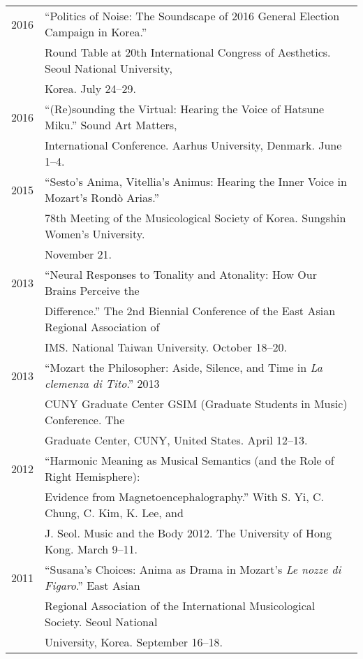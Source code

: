 \documentclass[a4paper,11pt]{article}
\begin{document}
  \hspace*{-0.25cm}
  \begin{tabular}{p{2.5cm} p{12.5cm}}
  2016 & ``Politics of Noise: The Soundscape of 2016 General Election Campaign in Korea.''\\
  & Round Table at 20th International Congress of Aesthetics. Seoul National University,\\
  & Korea. July 24--29.\\[2mm]
  
  2016 & ``(Re)sounding the Virtual: Hearing the Voice of Hatsune Miku.'' Sound Art Matters,\\
  & International Conference. Aarhus University, Denmark. June 1--4.\\[2mm]
  
  2015 & ``Sesto's Anima, Vitellia's Animus: Hearing the Inner Voice in Mozart’s Rond\`{o} Arias.''\\
  & 78th Meeting of the Musicological Society of Korea. Sungshin Women's University.\\
  & November 21.\\[2mm]
  
  2013 & “Neural Responses to Tonality and Atonality: How Our Brains Perceive the\\
  & Difference.” The 2nd Biennial Conference of the East Asian Regional Association of\\
  & IMS. National Taiwan University. October 18–20.\\[2mm]
  
  2013 & “Mozart the Philosopher: Aside, Silence, and Time in \textit{La clemenza di Tito}.” 2013\\
  & CUNY Graduate Center GSIM (Graduate Students in Music) Conference. The\\
  & Graduate Center, CUNY, United States. April 12–13.\\[2mm]

  2012 & “Harmonic Meaning as Musical Semantics (and the Role of Right Hemisphere):\\
  & Evidence from Magnetoencephalography.” With S. Yi, C. Chung, C. Kim, K. Lee, and\\
  & J. Seol. Music and the Body 2012. The University of Hong Kong. March 9–11.\\[2mm]

  2011 & “Susana’s Choices: Anima as Drama in Mozart’s \textit{Le nozze di Figaro}.” East Asian\\
  & Regional Association of the International Musicological Society. Seoul National\\
  & University, Korea. September 16–18.\\[2mm]


\end{tabular}
\end{document}
